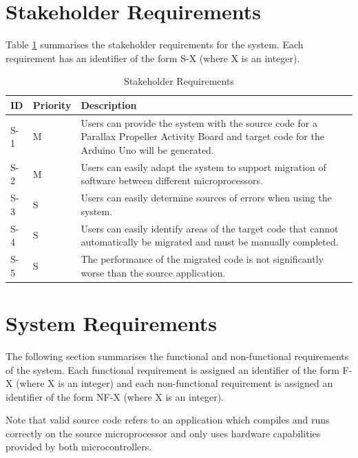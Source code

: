 \documentclass{UoYCSproject}
\newcommand{\ra}[1]{\renewcommand{\arraystretch}{#1}}
\begin{document}
\section{Stakeholder Requirements} \label{stakeholder_reqs}
Table \ref{table:stakeholder_req} summarises the stakeholder requirements for the system. Each requirement has an identifier of the form S-X (where X is an integer).
\begin{table}[h!]\centering
\ra{1.3}
  \begin{tabular}{@{}p{}p{}p{}@{}} \toprule 
  \textbf{ID} & \textbf{Priority} & \textbf{Description} \\
  \midrule
  S-1 & M & Users can provide the system with the source code for a Parallax Propeller Activity Board and target code for the Arduino Uno will be generated. \\ 
  S-2 & M & Users can easily adapt the system to support migration of software between different microprocessors. \\
  S-3 & S & Users can easily determine sources of errors when using the system. \\
  S-4 & S & Users can easily identify areas of the target code that cannot automatically be migrated and must be manually completed. \\
  S-5 & S & The performance of the migrated code is not significantly worse than the source application. \\
  \bottomrule
  \end{tabular}
\caption{Stakeholder Requirements}
\label{table:stakeholder_req}
\end{table}

\section{System Requirements} \label{sys_reqs}
The following section summarises the functional and non-functional requirements of the system. Each functional requirement is assigned an identifier of the form F-X (where X is an integer) and each non-functional requirement is assigned an identifier of the form NF-X (where X is an integer).

Note that valid source code refers to an application which compiles and runs correctly on the source microprocessor and only uses hardware capabilities provided by both microcontrollers.
\newpage
\end{document}
